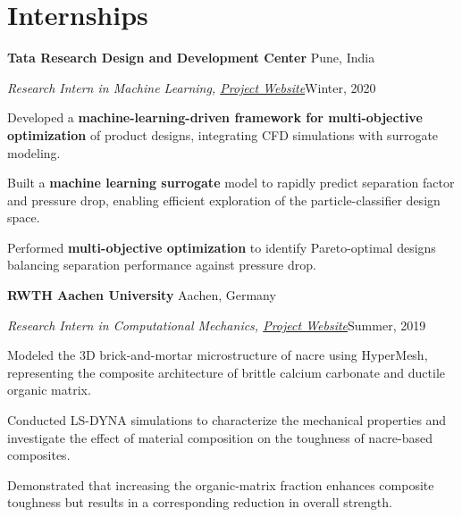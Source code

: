 \section{\sc Internships}
\textbf{Tata Research Design and Development Center} \hfill Pune, India\\
{\parfillskip=0pt \emph{Research Intern in Machine Learning, \href{https://m-raj.github.io/pages/projects/particle_classifier_optimisation.html}{Project Website}}\hfill Winter, 2020\par}
\begin{list1}
    \item Developed a \textbf{machine-learning-driven framework for multi-objective optimization} of product designs, integrating CFD simulations with surrogate modeling.

\item Built a \textbf{machine learning surrogate} model to rapidly predict separation factor and pressure drop, enabling efficient exploration of the particle-classifier design space.
\item Performed \textbf{multi-objective optimization} to identify Pareto-optimal designs balancing separation performance against pressure drop.
\end{list1}

\textbf{RWTH Aachen University} \hfill Aachen, Germany\\
{\parfillskip=0pt \emph{Research Intern in Computational Mechanics, \href{https://m-raj.github.io/projects/nacre-composites/}{Project Website}}\hfill Summer, 2019\par}
\begin{list1}
    \item Modeled the 3D brick-and-mortar microstructure of nacre using HyperMesh, representing the composite architecture of brittle calcium carbonate and ductile organic matrix.

\item Conducted LS-DYNA simulations to characterize the mechanical properties and investigate the effect of material composition on the toughness of nacre-based composites.

\item Demonstrated that increasing the organic-matrix fraction enhances composite toughness but results in a corresponding reduction in overall strength.
\end{list1}
\endinput
